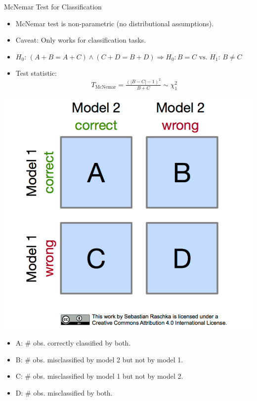 \documentclass[11pt,compress,t,notes=noshow, xcolor=table]{beamer}
\begin{document}
\begin{frame}{McNemar Test for Classification}
\begin{itemize}
\item McNemar test is non-parametric (no distributional assumptions).
\item Caveat: Only works for classification tasks.
\item $H_0$: $(A + B = A + C) \land (C + D = B + D) \Rightarrow H_0: B = C \text{ vs. } H_1$:  $B \neq C$
\item Test statistic:
$$T_{\text{McNemar}} =  \tfrac{(|B-C| - 1)^2}{B + C} \sim \chi^2_{1}
$$
\end{itemize}

\begin{minipage}{0.45\textwidth}
\includegraphics[width=\textwidth]{figure/mcnemar_1.png} \end{minipage}
\begin{minipage}{0.54\textwidth}
\begin{itemize}
\item A: $\#$ obs. correctly classified by both.
\item B: $\#$ obs. misclassified by model 2 but not by model 1.
\item C: $\#$ obs. misclassified by model 1 but not by model 2.
\item D: $\#$ obs. misclassified by both.
\end{itemize}
\end{minipage}
\end{frame}
\end{document}
